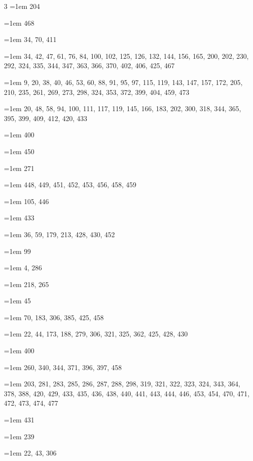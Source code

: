 \begin{multicols}{3}
\hangindent=1em  204\par
\hangindent=1em  468\par
\hangindent=1em  34, 70, 411\par
\hangindent=1em  34, 42, 47, 61, 76, 84, 100, 102, 125, 126, 132, 144, 156, 165, 200, 202, 230, 292, 324, 335, 344, 347, 363, 366, 370, 402, 406, 425, 467\par
\hangindent=1em  9, 20, 38, 40, 46, 53, 60, 88, 91, 95, 97, 115, 119, 143, 147, 157, 172, 205, 210, 235, 261, 269, 273, 298, 324, 353, 372, 399, 404, 459, 473\par
\hangindent=1em  20, 48, 58, 94, 100, 111, 117, 119, 145, 166, 183, 202, 300, 318, 344, 365, 395, 399, 409, 412, 420, 433\par
\hangindent=1em  400\par
\hangindent=1em  450\par
\hangindent=1em  271\par
\hangindent=1em  448, 449, 451, 452, 453, 456, 458, 459\par
\hangindent=1em  105, 446\par
\hangindent=1em  433\par
\hangindent=1em  36, 59, 179, 213, 428, 430, 452\par
\hangindent=1em  99\par
\hangindent=1em  4, 286\par
\hangindent=1em  218, 265\par
\hangindent=1em  45\par
\hangindent=1em  70, 183, 306, 385, 425, 458\par
\hangindent=1em  22, 44, 173, 188, 279, 306, 321, 325, 362, 425, 428, 430\par
\hangindent=1em  400\par
\hangindent=1em  260, 340, 344, 371, 396, 397, 458\par
\hangindent=1em  203, 281, 283, 285, 286, 287, 288, 298, 319, 321, 322, 323, 324, 343, 364, 378, 388, 420, 429, 433, 435, 436, 438, 440, 441, 443, 444, 446, 453, 454, 470, 471, 472, 473, 474, 477\par
\hangindent=1em  431\par
\hangindent=1em  239\par
\hangindent=1em  22, 43, 306\par

\end{multicols}
